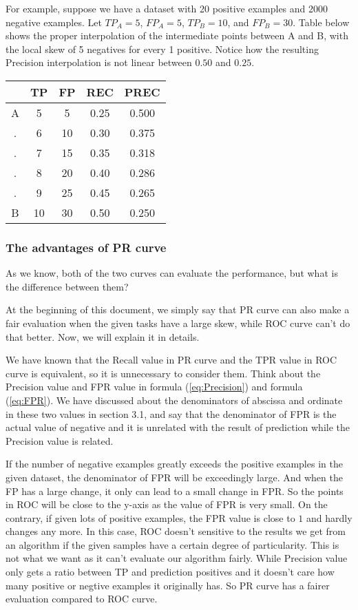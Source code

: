 \documentclass[a4paper,12pt]{article}
\begin{document}
\begin{enumerate}
For example, suppose we have a dataset with 20 positive examples and 2000 negative examples. Let $TP_A=5$, $FP_A=5$, $TP_B=10$, and $FP_B=30$. Table below  shows the proper interpolation of the intermediate points between A and B, with the local skew of 5 negatives for every 1 positive. Notice how the resulting Precision interpolation is not linear between $0.50$ and $0.25$.
\begin{center}
\begin{tabular}{|c|c|c|c|c|}
\hline
 &TP&FP&REC&PREC\\
\hline
A&5&5&0.25&0.500\\
.&6&10&0.30&0.375\\
.&7&15&0.35&0.318\\
.&8&20&0.40&0.286\\
.&9&25&0.45&0.265\\
B&10&30&0.50&0.250\\
\hline
\end{tabular}
\end{center}
 
\end{enumerate}

\subsubsection{The advantages of PR curve}
As we know, both of the two curves can evaluate the performance, but what is the difference between them? 

At the beginning of this document, we simply say that PR curve can also make a fair evaluation when the given tasks have a large skew, while ROC curve can't do that better. Now, we will explain it in details.

We have known that the Recall value in PR curve and the TPR value in ROC curve is equivalent, so it is unnecessary to consider them. Think about the Precision value and FPR value in formula (\ref{eq:Precision}) and formula (\ref{eq:FPR}). We have discussed about the denominators of abscissa and ordinate in these two values in section 3.1, and say that the denominator of FPR is the actual value of negative and it is unrelated with the result of prediction while the Precision value is related.

If the number of negative examples greatly exceeds the positive examples in the given dataset, the denominator of FPR will be exceedingly large. And when the FP has a large change, it only can lead to a small change in FPR. So the points in ROC will be close to the y-axis as the value of FPR is very small. On the contrary, if given lots of positive examples, the FPR value is close to $1$ and hardly changes any more. In this case, ROC doesn't sensitive to the results we get from an algorithm if the given samples have a certain degree of particularity. This is not what we want as it can't evaluate our algorithm fairly. While Precision value only gets a ratio between TP and prediction positives and it doesn't care how many positive or negtive examples it originally has. So PR curve has a fairer evaluation compared to ROC curve.
\end{document}
